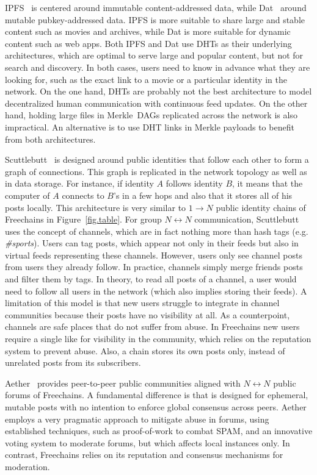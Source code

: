 \documentclass[10pt,journal,compsoc]{IEEEtran}
\newcommand{\FC}       {Freechains\xspace}
\newcommand{\Xon} {$1{\rightarrow}N$\xspace}
\newcommand{\Xnn} {$N{\leftrightarrow}N$\xspace}
\begin{document}
IPFS~\cite{p2p.ipfs} is centered around immutable content-addressed data, while
Dat~\cite{p2p.dat} around mutable pubkey-addressed data.
IPFS is more suitable to share large and stable content such as movies and
archives, while Dat is more suitable for dynamic content such as web apps.
%
Both IPFS and Dat use DHTs as their underlying architectures, which are optimal
to serve large and popular content, but not for search and discovery.
In both cases, users need to know in advance what they are looking for, such as
the exact link to a movie or a particular identity in the network.
%
On the one hand, DHTs are probably not the best architecture to model
decentralized human communication with continuous feed updates.
On the other hand, holding large files in Merkle~DAGs replicated across the
network is also impractical.
An alternative is to use DHT links in Merkle payloads to benefit from both
architectures.

Scuttlebutt~\cite{p2p.scuttlebutt} is designed around public identities that
follow each other to form a graph of connections.
This graph is replicated in the network topology as well as in data storage.
For instance, if identity $A$ follows identity $B$, it means that the computer
of $A$ connects to $B$'s in a few hops and also that it stores all of his posts
locally.
This architecture is very similar to \Xon public identity chains of \FC in
Figure~\ref{fig.table}.
%
For group \Xnn communication, Scuttlebutt uses the concept of channels, which
are in fact nothing more than hash tags (e.g. \emph{\#sports}).
Users can tag posts, which appear not only in their feeds but also in virtual
feeds representing these channels.
However, users only see channel posts from users they already follow.
In practice, channels simply merge friends posts and filter them by tags.
In theory, to read all posts of a channel, a user would need to follow all
users in the network (which also implies storing their feeds).
A limitation of this model is that new users struggle to integrate in channel
communities because their posts have no visibility at all.
As a counterpoint, channels are safe places that do not suffer from abuse.
%
In \FC new users require a single like for visibility in the community, which
relies on the reputation system to prevent abuse.
Also, a chain stores its own posts only, instead of unrelated posts from its
subscribers.

Aether~\cite{p2p.ecosystem} provides peer-to-peer public communities aligned
with \Xnn public forums of \FC.
A fundamental difference is that is designed for ephemeral, mutable posts with
no intention to enforce global consensus across peers.
Aether employs a very pragmatic approach to mitigate abuse in forums, using
established techniques, such as proof-of-work to combat SPAM, and an innovative
voting system to moderate forums, but which affects local instances only.
In contrast, \FC relies on its reputation and consensus mechanisms for
moderation.
\end{document}

